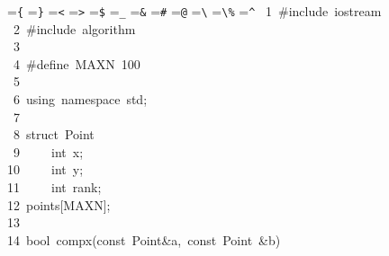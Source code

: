 \documentclass{article}
\newcommand{\hlstd}[1]{\textcolor[rgb]{0.2,0.2,0.2}{#1}}
\newcommand{\hlppc}[1]{\textcolor[rgb]{0.41,0.78,0.23}{#1}}
\newcommand{\hlopt}[1]{\textcolor[rgb]{0.2,0.2,0.2}{#1}}
\newcommand{\hllin}[1]{\textcolor[rgb]{0.59,0.59,0.59}{#1}}
\newcommand{\hlkwa}[1]{\textcolor[rgb]{0.23,0.42,0.78}{#1}}
\newcommand{\hlkwb}[1]{\textcolor[rgb]{0.63,0,0.31}{#1}}
\newcommand{\hlkwd}[1]{\textcolor[rgb]{0.78,0.23,0.41}{#1}}
\begin{document}
	\pagecolor{bgcolor}
	\newsavebox{\hlboxopenbrace}
	\newsavebox{\hlboxclosebrace}
	\newsavebox{\hlboxlessthan}
	\newsavebox{\hlboxgreaterthan}
	\newsavebox{\hlboxdollar}
	\newsavebox{\hlboxunderscore}
	\newsavebox{\hlboxand}
	\newsavebox{\hlboxhash}
	\newsavebox{\hlboxat}
	\newsavebox{\hlboxbackslash}
	\newsavebox{\hlboxpercent}
	\newsavebox{\hlboxhat}
	\setbox\hlboxopenbrace=\hbox{\verb.{.}
	\setbox\hlboxclosebrace=\hbox{\verb.}.}
	\setbox\hlboxlessthan=\hbox{\verb.<.}
	\setbox\hlboxgreaterthan=\hbox{\verb.>.}
	\setbox\hlboxdollar=\hbox{\verb.$.}
	\setbox\hlboxunderscore=\hbox{\verb._.}
	\setbox\hlboxand=\hbox{\verb.&.}
	\setbox\hlboxhash=\hbox{\verb.#.}
	\setbox\hlboxat=\hbox{\verb.@.}
	\setbox\hlboxbackslash=\hbox{\verb.\.}
	\setbox\hlboxpercent=\hbox{\verb.\%.}
	\setbox\hlboxhat=\hbox{\verb.^.}
	\def\urltilda{\kern -.15em\lower .7ex\hbox{\~{}}\kern .04em}
	\noindent
	\ttfamily
	\hlstd{}\hllin{\ 1\ }\hlstd{}\hlppc{\#include\ \usebox{\hlboxlessthan}iostream\usebox{\hlboxgreaterthan}}\\
	\hllin{\ 2\ }\hlstd{}\hlppc{\#include\ \usebox{\hlboxlessthan}algorithm\usebox{\hlboxgreaterthan}}\\
	\hllin{\ 3\ }\hlstd{}\\
	\hllin{\ 4\ }\hlstd{}\hlppc{\#define\ MAX\textunderscore N\ 100}\\
	\hllin{\ 5\ }\hlstd{}\\
	\hllin{\ 6\ }\hlstd{}\hlkwa{using\ namespace\ }\hlstd{std}\hlopt{;}\\
	\hllin{\ 7\ }\hlstd{}\\
	\hllin{\ 8\ }\hlstd{}\hlkwb{struct\ }\hlstd{Point}\hlopt{\usebox{\hlboxopenbrace}}\\
	\hllin{\ 9\ }\hlstd{}\hlstd{\ \ \ \ }\hlstd{}\hlkwb{int\ }\hlstd{x}\hlopt{;}\\
	\hllin{10\ }\hlstd{}\hlstd{\ \ \ \ }\hlstd{}\hlkwb{int\ }\hlstd{y}\hlopt{;}\\
	\hllin{11\ }\hlstd{}\hlstd{\ \ \ \ }\hlstd{}\hlkwb{int\ }\hlstd{rank}\hlopt{;}\\
	\hllin{12\ }\hlstd{}\hlopt{\usebox{\hlboxclosebrace}}\hlstd{points}\hlopt{{[}}\hlstd{MAX\textunderscore N}\hlopt{{]};}\\
	\hllin{13\ }\hlstd{}\\
	\hllin{14\ }\hlstd{}\hlkwb{bool\ }\hlstd{}\hlkwd{comp\textunderscore x}\hlstd{}\hlopt{(}\hlstd{}\hlkwb{const\ }\hlstd{Point}\hlopt{\&}\hlstd{a}\hlopt{,\ }\hlstd{}\hlkwb{const\ }\hlstd{Point\ }\hlopt{\&}\hlstd{b}\hlopt{)\usebox{\hlboxopenbrace}}\\
\end{document}
